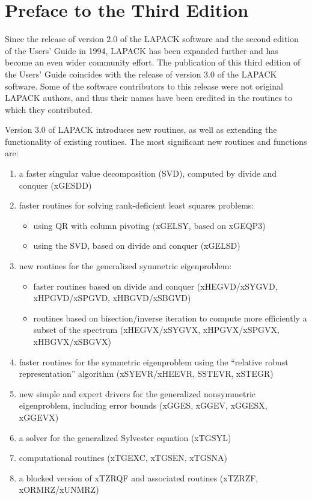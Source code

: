 \chapter*{Preface to the Third Edition}

Since the release of version 2.0 of the LAPACK software and the second edition
of the Users' Guide in 1994, LAPACK has been expanded further and has become an
even wider community effort.
The publication of this third edition of the
Users' Guide coincides with the release of version 3.0
of the LAPACK software.  Some of the software contributors to this release
were not original LAPACK authors, and thus their names have been
credited in the routines to which they contributed.

Version 3.0 of LAPACK introduces new routines, as well as extending
the functionality of existing routines.  The most significant
new routines and functions are:
\begin{enumerate}
 \item a faster singular value decomposition (SVD),
    computed by divide and conquer (xGESDD)
 \item faster routines for solving rank-deficient least squares problems:
    \begin{itemize}
     \item  using QR with column pivoting (xGELSY, based on xGEQP3)
     \item  using the SVD, based on divide and conquer (xGELSD)
    \end{itemize}
 \item new routines for the generalized symmetric eigenproblem:
     \begin{itemize}
      \item faster routines based on divide and conquer
         (xHEGVD/xSYGVD, xHPGVD/xSPGVD, xHBGVD/xSBGVD) 
      \item routines based on
         bisection/inverse iteration to compute more efficiently
         a subset of the spectrum
        (xHEGVX/xSYGVX, xHPGVX/xSPGVX, xHBGVX/xSBGVX)
      \end{itemize}
\item  faster routines for the symmetric eigenproblem using the
     ``relative robust representation'' algorithm
     (xSYEVR/xHEEVR, SSTEVR, xSTEGR)
 \item new simple and expert drivers for the generalized nonsymmetric
    eigenproblem, including error bounds (xGGES, xGGEV, xGGESX, xGGEVX)
 \item a solver for the generalized Sylvester equation (xTGSYL)
 \item computational routines (xTGEXC, xTGSEN, xTGSNA)
 \item a blocked version of xTZRQF and associated routines (xTZRZF, xORMRZ/xUNMRZ)
\end{enumerate}


